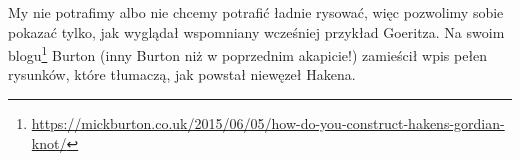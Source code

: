 
My nie potrafimy albo nie chcemy potrafić ładnie rysować, więc pozwolimy sobie pokazać tylko, jak wyglądał wspomniany wcześniej przykład Goeritza.
Na swoim blogu\footnote{\url{https://mickburton.co.uk/2015/06/05/how-do-you-construct-hakens-gordian-knot/}} Burton (inny Burton niż w poprzednim akapicie!) zamieścił wpis pełen rysunków, które tłumaczą, jak powstał niewęzeł Hakena.

